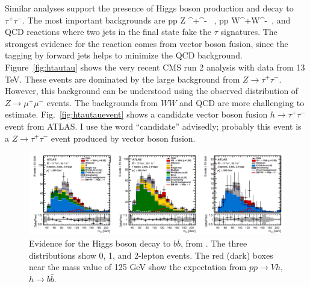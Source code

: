 \documentclass[12pt]{article}
\begin{document}
Similar analyses support the presence of Higgs boson production and
decay to $\tau^+\tau^-$.   The most important backgrounds are 
\beq
     pp \to Z \to \tau^+\tau^- \ , \qquad   pp \to W^+W^-\ , 
\eeqn
and QCD reactions where two jets in the final state fake the $\tau$
signatures.    The strongest evidence for the reaction comes from
vector boson fusion, since the tagging by forward jets helps to
minimize the QCD background.   Figure~\ref{fig:htautau}  shows the
very recent 
CMS run 2 analysis with data from 13 TeV.   These events are dominated
by the 
large background from 
$Z\to \tau^+\tau^-$.  However,  this background can be understood  using the
observed distribution of $Z\to \mu^+\mu^-$ events.   The backgrounds
from $WW$ and QCD are more challenging to estimate.
Fig.~\ref{fig:htautauevent} shows a candidate vector boson fusion
$h\to \tau^+\tau^-$ event from ATLAS.   I use the word ``candidate''
advisedly; probably this event is  a $Z\to \tau^+\tau^-$ event produced by vector boson
fusion. 

\begin{figure}
\begin{center}
\includegraphics[width=0.99\hsize]{ATLASHbb2017.pdf}
\end{center}
\caption{Evidence for the Higgs boson decay to $b\bar b$, from
  \cite{ATLAShbb}. The three distributions show 0, 1, and 2-lepton
  events.  The red (dark) boxes near the mass value of 125 GeV show  the expectation from $pp\to Vh$, $h\to
b\bar b$. }
\label{fig:hbb}
\end{figure}
\end{document}
